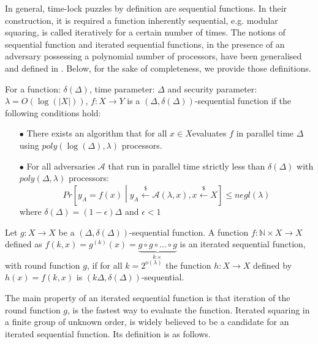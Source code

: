 



In general, time-lock puzzles by definition are sequential functions.  In their construction, it is required a  function inherently sequential, e.g. modular squaring, is called iteratively for a certain number of times.  The notions of sequential function and iterated sequential functions, in the presence of an adversary possessing a polynomial number of processors, have been generalised and defined in \cite{BonehBBF18}. Below, for the sake of completeness, we provide those  definitions. 


\begin{definition}
For a function: $\delta(\Delta)$, time parameter: $\Delta$ and security parameter: $\lambda=O(\log(|X|))$,  $f:X\rightarrow Y$ is a $(\Delta,\delta(\Delta))$-sequential function if the following conditions hold:
\begin{itemize}
\item[$\bullet$] There exists an algorithm that for all $x\in X$evaluates $f$ in parallel time $\Delta$ using $poly(\log(\Delta),\lambda)$ processors.
\item[$\bullet$] For all adversaries $\mathcal{A}$ that run in parallel time strictly less than $\delta(\Delta)$ with $poly(\Delta,\lambda)$ processors: 
$$Pr\left[y_{\scriptscriptstyle A}=f(x)\middle |  y_{\scriptscriptstyle A}\stackrel{\scriptscriptstyle \$}\leftarrow \mathcal {A}(\lambda,x), x\stackrel{\scriptscriptstyle \$}\leftarrow X\right]\leq negl(\lambda)$$
where $\delta(\Delta)=(1-\epsilon)\Delta$ and $\epsilon<1$
\end{itemize}
\end{definition}

\begin{definition} Let $g:X\rightarrow X$ be a $(\Delta,\delta(\Delta))$-sequential function. A function $f: \mathbb{N}\times X\rightarrow X$ defined as $f(k,x)=g^{\scriptscriptstyle (k)}(x)=\underbrace{g\circ g\circ... \circ g}_{\scriptscriptstyle k\times}$ is  an iterated sequential function, with round function $g$, if for all $k=2^{\scriptscriptstyle o(\lambda)}$ the function $h:X\rightarrow X$ defined by  $h(x)=f(k,x)$ is $(k\Delta,\delta(\Delta))$-sequential. 

\end{definition}

The main property of an iterated sequential function is that iteration of the round function $g$, is the fastest way to evaluate the function. Iterated squaring  in a finite group of unknown order, is widely believed to be a candidate for an iterated sequential function. Its definition is  as follows. 
